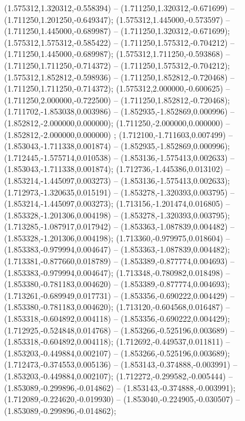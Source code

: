  (1.575312,1.320312,-0.558394) -- (1.711250,1.320312,-0.671699) -- (1.711250,1.201250,-0.649347);
 (1.575312,1.445000,-0.573597) -- (1.711250,1.445000,-0.689987) -- (1.711250,1.320312,-0.671699);
 (1.575312,1.575312,-0.585422) -- (1.711250,1.575312,-0.704212) -- (1.711250,1.445000,-0.689987);
 (1.575312,1.711250,-0.593868) -- (1.711250,1.711250,-0.714372) -- (1.711250,1.575312,-0.704212);
 (1.575312,1.852812,-0.598936) -- (1.711250,1.852812,-0.720468) -- (1.711250,1.711250,-0.714372);
 (1.575312,2.000000,-0.600625) -- (1.711250,2.000000,-0.722500) -- (1.711250,1.852812,-0.720468);
 (1.711702,-1.853038,0.003986) -- (1.852935,-1.852869,0.000996) -- (1.852812,-2.000000,0.000000);
 (1.711250,-2.000000,0.000000) -- (1.852812,-2.000000,0.000000) ;
 (1.712100,-1.711603,0.007499) -- (1.853043,-1.711338,0.001874) -- (1.852935,-1.852869,0.000996);
 (1.712445,-1.575714,0.010538) -- (1.853136,-1.575413,0.002633) -- (1.853043,-1.711338,0.001874);
 (1.712736,-1.445386,0.013102) -- (1.853214,-1.445097,0.003273) -- (1.853136,-1.575413,0.002633);
 (1.712973,-1.320635,0.015191) -- (1.853278,-1.320393,0.003795) -- (1.853214,-1.445097,0.003273);
 (1.713156,-1.201474,0.016805) -- (1.853328,-1.201306,0.004198) -- (1.853278,-1.320393,0.003795);
 (1.713285,-1.087917,0.017942) -- (1.853363,-1.087839,0.004482) -- (1.853328,-1.201306,0.004198);
 (1.713360,-0.979975,0.018604) -- (1.853383,-0.979994,0.004647) -- (1.853363,-1.087839,0.004482);
 (1.713381,-0.877660,0.018789) -- (1.853389,-0.877774,0.004693) -- (1.853383,-0.979994,0.004647);
 (1.713348,-0.780982,0.018498) -- (1.853380,-0.781183,0.004620) -- (1.853389,-0.877774,0.004693);
 (1.713261,-0.689949,0.017731) -- (1.853356,-0.690222,0.004429) -- (1.853380,-0.781183,0.004620);
 (1.713120,-0.604568,0.016487) -- (1.853318,-0.604892,0.004118) -- (1.853356,-0.690222,0.004429);
 (1.712925,-0.524848,0.014768) -- (1.853266,-0.525196,0.003689) -- (1.853318,-0.604892,0.004118);
 (1.712692,-0.449537,0.011811) -- (1.853203,-0.449884,0.002107) -- (1.853266,-0.525196,0.003689);
 (1.712473,-0.374553,0.005136) -- (1.853143,-0.374888,-0.003991) -- (1.853203,-0.449884,0.002107);
 (1.712272,-0.299582,-0.005444) -- (1.853089,-0.299896,-0.014862) -- (1.853143,-0.374888,-0.003991);
 (1.712089,-0.224620,-0.019930) -- (1.853040,-0.224905,-0.030507) -- (1.853089,-0.299896,-0.014862);

